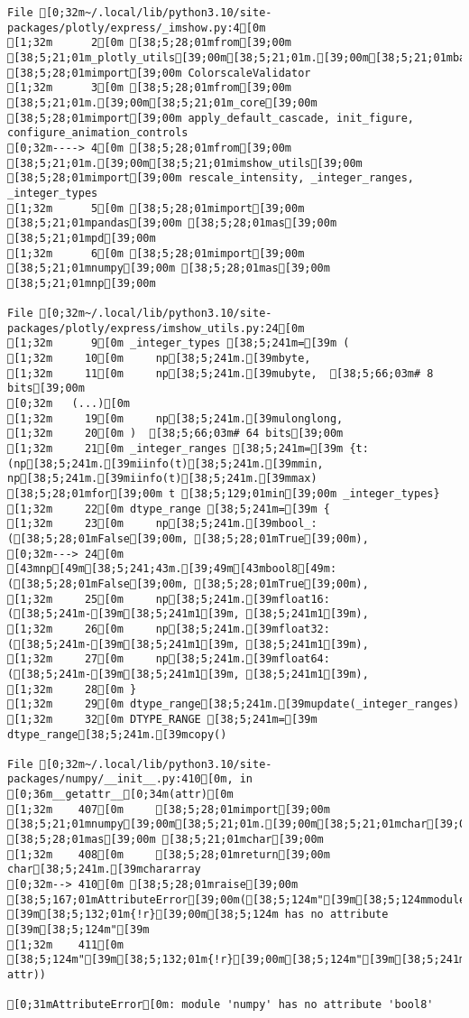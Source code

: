 \documentclass[
  a4paper,
  portrait]{book}
\begin{document}
\begin{verbatim}
File [0;32m~/.local/lib/python3.10/site-packages/plotly/express/_imshow.py:4[0m
[1;32m      2[0m [38;5;28;01mfrom[39;00m [38;5;21;01m_plotly_utils[39;00m[38;5;21;01m.[39;00m[38;5;21;01mbasevalidators[39;00m [38;5;28;01mimport[39;00m ColorscaleValidator
[1;32m      3[0m [38;5;28;01mfrom[39;00m [38;5;21;01m.[39;00m[38;5;21;01m_core[39;00m [38;5;28;01mimport[39;00m apply_default_cascade, init_figure, configure_animation_controls
[0;32m----> 4[0m [38;5;28;01mfrom[39;00m [38;5;21;01m.[39;00m[38;5;21;01mimshow_utils[39;00m [38;5;28;01mimport[39;00m rescale_intensity, _integer_ranges, _integer_types
[1;32m      5[0m [38;5;28;01mimport[39;00m [38;5;21;01mpandas[39;00m [38;5;28;01mas[39;00m [38;5;21;01mpd[39;00m
[1;32m      6[0m [38;5;28;01mimport[39;00m [38;5;21;01mnumpy[39;00m [38;5;28;01mas[39;00m [38;5;21;01mnp[39;00m

File [0;32m~/.local/lib/python3.10/site-packages/plotly/express/imshow_utils.py:24[0m
[1;32m      9[0m _integer_types [38;5;241m=[39m (
[1;32m     10[0m     np[38;5;241m.[39mbyte,
[1;32m     11[0m     np[38;5;241m.[39mubyte,  [38;5;66;03m# 8 bits[39;00m
[0;32m   (...)[0m
[1;32m     19[0m     np[38;5;241m.[39mulonglong,
[1;32m     20[0m )  [38;5;66;03m# 64 bits[39;00m
[1;32m     21[0m _integer_ranges [38;5;241m=[39m {t: (np[38;5;241m.[39miinfo(t)[38;5;241m.[39mmin, np[38;5;241m.[39miinfo(t)[38;5;241m.[39mmax) [38;5;28;01mfor[39;00m t [38;5;129;01min[39;00m _integer_types}
[1;32m     22[0m dtype_range [38;5;241m=[39m {
[1;32m     23[0m     np[38;5;241m.[39mbool_: ([38;5;28;01mFalse[39;00m, [38;5;28;01mTrue[39;00m),
[0;32m---> 24[0m     [43mnp[49m[38;5;241;43m.[39;49m[43mbool8[49m: ([38;5;28;01mFalse[39;00m, [38;5;28;01mTrue[39;00m),
[1;32m     25[0m     np[38;5;241m.[39mfloat16: ([38;5;241m-[39m[38;5;241m1[39m, [38;5;241m1[39m),
[1;32m     26[0m     np[38;5;241m.[39mfloat32: ([38;5;241m-[39m[38;5;241m1[39m, [38;5;241m1[39m),
[1;32m     27[0m     np[38;5;241m.[39mfloat64: ([38;5;241m-[39m[38;5;241m1[39m, [38;5;241m1[39m),
[1;32m     28[0m }
[1;32m     29[0m dtype_range[38;5;241m.[39mupdate(_integer_ranges)
[1;32m     32[0m DTYPE_RANGE [38;5;241m=[39m dtype_range[38;5;241m.[39mcopy()

File [0;32m~/.local/lib/python3.10/site-packages/numpy/__init__.py:410[0m, in [0;36m__getattr__[0;34m(attr)[0m
[1;32m    407[0m     [38;5;28;01mimport[39;00m [38;5;21;01mnumpy[39;00m[38;5;21;01m.[39;00m[38;5;21;01mchar[39;00m [38;5;28;01mas[39;00m [38;5;21;01mchar[39;00m
[1;32m    408[0m     [38;5;28;01mreturn[39;00m char[38;5;241m.[39mchararray
[0;32m--> 410[0m [38;5;28;01mraise[39;00m [38;5;167;01mAttributeError[39;00m([38;5;124m"[39m[38;5;124mmodule [39m[38;5;132;01m{!r}[39;00m[38;5;124m has no attribute [39m[38;5;124m"[39m
[1;32m    411[0m                      [38;5;124m"[39m[38;5;132;01m{!r}[39;00m[38;5;124m"[39m[38;5;241m.[39mformat([38;5;18m__name__[39m, attr))

[0;31mAttributeError[0m: module 'numpy' has no attribute 'bool8'
\end{verbatim}
\end{document}
